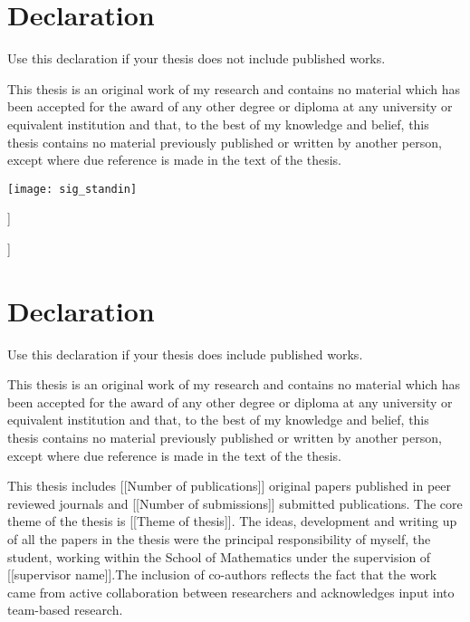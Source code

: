 \section*{Declaration}

{\color{blue}Use this declaration if your thesis does not include published
works.}

\vspace{1cm}

{
  This thesis is an original work of my research and contains no material which
  has been accepted for the award of any other degree or diploma at any
  university or equivalent institution and that, to the best of my knowledge
  and belief, this thesis contains no material previously published or written
  by another person, except where due reference is made in the text of the
  thesis.
}

\vspace{1cm}

\qquad \texttt{[image: sig\_standin]}

\qquad [[Name]]

\qquad [[Date in `dd Month yyyy' format]]

\clearpage

\section*{Declaration}

{\color{blue}Use this declaration if your thesis does include published works.}

\vspace{1cm}

{
  This thesis is an original work of my research and contains no material which
  has been accepted for the award of any other degree or diploma at any
  university or equivalent institution and that, to the best of my knowledge
  and belief, this thesis contains no material previously published or written
  by another person, except where due reference is made in the text of the
  thesis.
}

\vspace{1cm}

{
  This thesis includes [[Number of publications]] original papers published in
  peer reviewed journals and [[Number of submissions]] submitted publications.
  The core theme of the thesis is [[Theme of thesis]]. The ideas, development
  and writing up of all the papers in the thesis were the principal
  responsibility of myself, the student, working within the School of
  Mathematics under the supervision of [[supervisor name]].{\color{blue}The
  inclusion of co-authors reflects the fact that the work came from active
  collaboration between researchers and acknowledges input into team-based
  research.}
}

